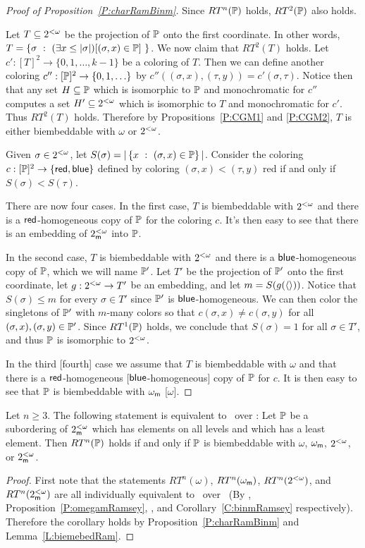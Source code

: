 \begin{proof}[Proof of Proposition~\ref{P:charRamBinm}]
Since $RT^n(\mathbb{P})$ holds, $RT^2(\mathbb{P})$ also holds.

Let $T\subseteq2^{<\omega}$ be the projection of $\mathbb{P}$ onto the first coordinate.
In other words, $T=\left\{\sigma\ :\ (\exists x\leq|\sigma|)[(\sigma,x)\in\mathbb{P}]\ \right\}$.
We now claim that $RT^2(T)$ holds.
Let $c':[T]^2\to\{0,1,\ldots,k-1\}$ be a coloring of $T$.
Then we can define another coloring $c'':[\mathbb{P}]^2\to\{0,1,\ldots\}$
by $c''((\sigma,x),(\tau,y))=c'(\sigma,\tau)$.
Notice then that any set $H\subseteq\mathbb{P}$ which is isomorphic
to $\mathbb{P}$ and monochromatic for $c''$ computes a set $H'\subseteq2^{<\omega}$
which is isomorphic to $T$ and monochromatic for $c'$.
Thus $RT^2(T)$ holds.
Therefore by Propositions~\ref{P:CGM1} and \ref{P:CGM2},
$T$ is either biembeddable with $\omega$ or $2^{<\omega}$.

Given $\sigma\in2^{<\omega}$, let $S(\sigma)=|\left\{x\ :\ (\sigma,x)\in\mathbb{P}\right\}|$.
Consider the coloring $c:[\mathbb{P}]^2\to\{\mathsf{red},\mathsf{blue}\}$ defined by
coloring $(\sigma,x)<(\tau,y)$ red if and only if $S(\sigma)<S(\tau)$.

There are now four cases.
In the first case, $T$ is biembeddable with $2^{<\omega}$ and
there is a $\mathsf{red}$-homogeneous copy of $\mathbb{P}$ for the coloring $c$.
It's then easy to see that there is an embedding of $2^{<\omega}_{\mathsf{m}}$ into $\mathbb{P}$.

In the second case, $T$ is biembeddable with $2^{<\omega}$ and
there is a $\mathsf{blue}$-homogeneous copy of $\mathbb{P}$,
which we will name $\mathbb{P}'$.
Let $T'$ be the projection of $\mathbb{P}'$ onto the first coordinate,
let $g:2^{<\omega}\to T'$ be an embedding, and let $m=S(g(\left\langle \right\rangle))$.
Notice that $S(\sigma)\leq m$ for every $\sigma\in T'$
since $\mathbb{P}'$ is $\mathsf{blue}$-homogeneous.
We can then color the singletons of $\mathbb{P}'$ with $m$-many
colors so that $c(\sigma,x)\neq c(\sigma,y)$ for all $(\sigma,x),(\sigma,y)\in\mathbb{P}'$.
Since $RT^1(\mathbb{P})$ holds, we conclude that $S(\sigma)=1$
for all $\sigma\in T'$, and thus $\mathbb{P}$ is isomorphic to $2^{<\omega}$.

In the third [fourth] case we assume that $T$ is biembeddable with
$\omega$ and that there is a $\mathsf{red}$-homogeneous [$\mathsf{blue}$-homogeneous]
copy of $\mathbb{P}$ for $c$.
It is then easy to see that $\mathbb{P}$ is biembeddable with $\omega_\mathsf{m}$ [$\omega$].
\end{proof}

\begin{thm}\label{T:charRamInBinm}
Let $n\geq 3$.
The following statement is equivalent to \ACAo\ over \RCAo:
Let $\mathbb{P}$ be a subordering of $2^{<\omega}_{\mathsf{m}}$ which has elements on all levels
and which has a least element.
Then $RT^n(\mathbb{P})$ holds if and only if $\mathbb{P}$ is biembeddable with
$\omega$, $\omega_\mathsf{m}$, $2^{<\omega}$, or $2^{<\omega}_{\mathsf{m}}$.
\end{thm}

\begin{proof}
First note that the statements $RT^n(\omega)$, $RT^n(\omega_\mathsf{m})$, $RT^n(2^{<\omega})$, and $RT^n(2^{<\omega}_{\mathsf{m}})$
are all individually equivalent to \ACAo\ over \RCAo\
(By \cite{SOSOA}, Proposition~\ref{P:omegamRamsey},
\cite{CHM}, and Corollary~\ref{C:binmRamsey} respectively).
Therefore the corollary holds by Proposition~\ref{P:charRamBinm} and Lemma~\ref{L:biemebedRam}.
\end{proof}
